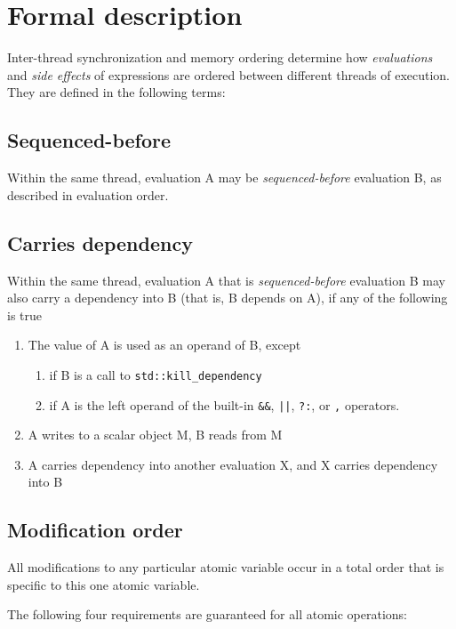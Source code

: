 \documentclass[a4paper,12pt,notitlepage,twoside,openright]{article}
\begin{document}
\section{Formal description}

Inter-thread synchronization and memory ordering determine how \emph{evaluations} and \emph{side effects} of expressions are ordered between different threads of execution. They are defined in the following terms:

\subsection{Sequenced-before}

Within the same thread, evaluation A may be \emph{sequenced-before} evaluation B, as described in evaluation order.

\subsection{Carries dependency}

Within the same thread, evaluation A that is \emph{sequenced-before} evaluation B may also carry a dependency into B (that is, B depends on A), if any of the following is true

\begin{enumerate}
  \item The value of A is used as an operand of B, except
  \begin{enumerate}
    \item if B is a call to \texttt{std::kill\_dependency}
    \item if A is the left operand of the built-in \texttt{\&\&}, \texttt{||}, \texttt{?:}, or \texttt{,} operators.
  \end{enumerate}
  \item A writes to a scalar object M, B reads from M
  \item A carries dependency into another evaluation X, and X carries dependency into B
\end{enumerate}

\subsection{Modification order}

All modifications to any particular atomic variable occur in a total order that is specific to this one atomic variable.

The following four requirements are guaranteed for all atomic operations:
\end{document}
